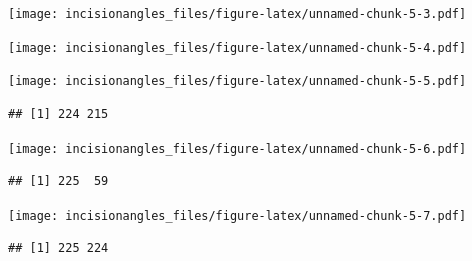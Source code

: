 \documentclass[
]{article}
\newenvironment{Shaded}{\begin{snugshade}}{\end{snugshade}}
\newcommand{\CommentTok}[1]{\textcolor[rgb]{0.56,0.35,0.01}{\textit{#1}}}
\newcommand{\FunctionTok}[1]{\textcolor[rgb]{0.13,0.29,0.53}{\textbf{#1}}}
\newcommand{\NormalTok}[1]{#1}
\newcommand{\SpecialCharTok}[1]{\textcolor[rgb]{0.81,0.36,0.00}{\textbf{#1}}}
\begin{document}
\texttt{[image: incisionangles\_files/figure-latex/unnamed-chunk-5-3.pdf]}

\begin{Shaded}
\end{Shaded}

\texttt{[image: incisionangles\_files/figure-latex/unnamed-chunk-5-4.pdf]}

\begin{Shaded}
\end{Shaded}

\texttt{[image: incisionangles\_files/figure-latex/unnamed-chunk-5-5.pdf]}

\begin{verbatim}
## [1] 224 215
\end{verbatim}

\begin{Shaded}
\end{Shaded}

\texttt{[image: incisionangles\_files/figure-latex/unnamed-chunk-5-6.pdf]}

\begin{verbatim}
## [1] 225  59
\end{verbatim}

\begin{Shaded}
\end{Shaded}

\texttt{[image: incisionangles\_files/figure-latex/unnamed-chunk-5-7.pdf]}

\begin{verbatim}
## [1] 225 224
\end{verbatim}

\begin{Shaded}
\end{Shaded}
\end{document}
